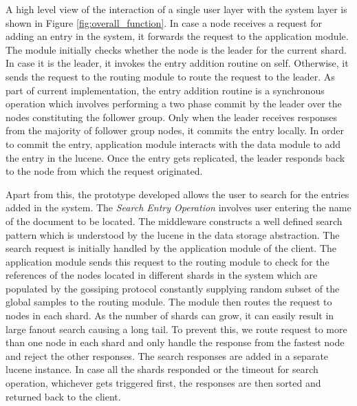 \documentclass[a4paper,11pt]{kth-mag}
\begin{document}
\par A high level view of the interaction of a single user layer with the system layer is shown in Figure \ref{fig:overall_function}. In case a node receives a request for adding an entry in the system, it forwards the request to the application module. The module initially checks whether the node is the leader for the current shard. In case it is the leader, it invokes the entry addition routine on self. Otherwise, it sends the request to the routing module to route the request to the leader. As part of current implementation, the entry addition routine is a synchronous operation which involves performing a two phase commit by the leader over the nodes constituting the follower group. Only when the leader receives responses from the majority of follower group nodes, it commits the entry locally. In order to commit the entry, application module interacts with the data module to add the entry in the lucene. Once the entry gets replicated, the leader responds back to the node from which the request originated.

\par Apart from this, the prototype developed allows the user to search for the entries added in the system. The \textit{Search Entry Operation} involves user entering the name of the document to be located. The middleware constructs a well defined search pattern which is understood by the lucene in the data storage abstraction. The search request is initially handled by the application module of the client. The application module sends this request to the routing module to check for the references of the nodes located in different shards in the system which are populated by the gossiping protocol constantly supplying random subset of the global samples to the routing module. The module then routes the request to nodes in each shard. As the number of shards can grow, it can easily result in large fanout search causing a long tail. To prevent this, we route request to more than one node in each shard and only handle the response from the fastest node and reject the other responses. The search responses are added in a separate lucene instance. In case all the shards responded or the timeout for search operation, whichever gets triggered first, the responses are then sorted and returned back to the client.
\end{document}
